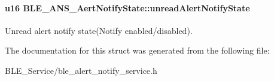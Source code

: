 \paragraph[{\texorpdfstring{unread\+Alert\+Notify\+State}{unreadAlertNotifyState}}]{\setlength{\rightskip}{0pt plus 5cm}u16 B\+L\+E\+\_\+\+A\+N\+S\+\_\+\+Aert\+Notify\+State\+::unread\+Alert\+Notify\+State}\hypertarget{struct_b_l_e___a_n_s___aert_notify_state_af5819cc66beed79f412ec8311186846c}{}\label{struct_b_l_e___a_n_s___aert_notify_state_af5819cc66beed79f412ec8311186846c}
Unread alert notify state(Notify enabled/disabled). 

The documentation for this struct was generated from the following file\+:\begin{DoxyCompactItemize}
\item 
B\+L\+E\+\_\+\+Service/ble\+\_\+alert\+\_\+notify\+\_\+service.\+h\end{DoxyCompactItemize}
